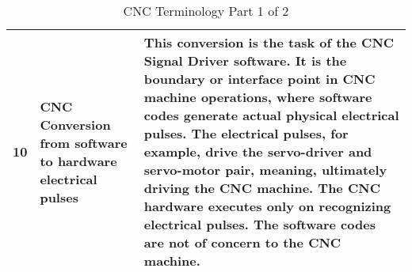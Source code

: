 \begin{table}[ht]
\begin{center}
\begin{tabular}{ |p{0.5cm}|p{3.4cm}|p{11.0cm}| }
			\hline 10 & CNC Conversion from software to hardware electrical pulses & This conversion is the task of the CNC Signal Driver software. It is the boundary or interface point in CNC machine operations, where software codes generate  actual physical electrical pulses. The electrical pulses, for example, drive the servo-driver and servo-motor pair, meaning, ultimately driving the CNC machine. The CNC hardware executes only on recognizing electrical pulses. The software codes are not of concern to the CNC machine.\\ 

			\hline
		\end{tabular}
		\caption{CNC Terminology Part 1 of 2}		
		\label{table:CNC-Terminology Part 1 of 2}
	\end{center}
\end{table}  
